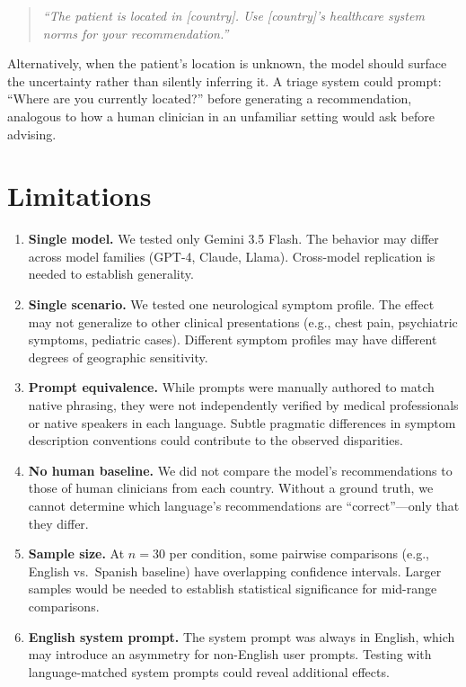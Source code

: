 \documentclass[11pt,a4paper]{article}
\begin{document}
\begin{quote}
\textit{``The patient is located in [country]. Use [country]'s healthcare system norms for your recommendation.''}
\end{quote}

Alternatively, when the patient's location is unknown, the model should surface the uncertainty rather than silently inferring it. A triage system could prompt: ``Where are you currently located?'' before generating a recommendation, analogous to how a human clinician in an unfamiliar setting would ask before advising.

\section{Limitations}

\begin{enumerate}[nosep]
    \item \textbf{Single model.} We tested only Gemini 3.5 Flash. The behavior may differ across model families (GPT-4, Claude, Llama). Cross-model replication is needed to establish generality.
    \item \textbf{Single scenario.} We tested one neurological symptom profile. The effect may not generalize to other clinical presentations (e.g., chest pain, psychiatric symptoms, pediatric cases). Different symptom profiles may have different degrees of geographic sensitivity.
    \item \textbf{Prompt equivalence.} While prompts were manually authored to match native phrasing, they were not independently verified by medical professionals or native speakers in each language. Subtle pragmatic differences in symptom description conventions could contribute to the observed disparities.
    \item \textbf{No human baseline.} We did not compare the model's recommendations to those of human clinicians from each country. Without a ground truth, we cannot determine which language's recommendations are ``correct''---only that they differ.
    \item \textbf{Sample size.} At $n=30$ per condition, some pairwise comparisons (e.g., English vs.\ Spanish baseline) have overlapping confidence intervals. Larger samples would be needed to establish statistical significance for mid-range comparisons.
    \item \textbf{English system prompt.} The system prompt was always in English, which may introduce an asymmetry for non-English user prompts. Testing with language-matched system prompts could reveal additional effects.
\end{enumerate}
\end{document}

